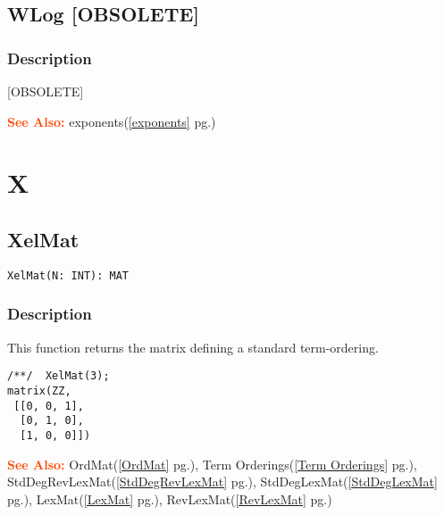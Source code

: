 \documentclass[a4paper]{mybook}
\newenvironment{command}{}{} %
\newcommand\SeeAlso{\par\textcolor{OrangeRed}{\textbf{\large See Also: }}}
\begin{document}
\section{WLog [OBSOLETE]}
\label{WLog [OBSOLETE]}
\begin{command} %



\subsection*{Description}

[OBSOLETE]

\SeeAlso %
  exponents(\ref{exponents} pg.\pageref{exponents})
\end{command} %

\chapter{X}  %
\label{X}

\section{XelMat}
\label{XelMat}
\begin{command} %


\begin{Verbatim}[label=syntax, rulecolor=\color{MidnightBlue},
frame=single]
XelMat(N: INT): MAT
\end{Verbatim}


\subsection*{Description}

This function returns the matrix defining a standard term-ordering.
\begin{Verbatim}[label=example, rulecolor=\color{PineGreen}, frame=single]
/**/  XelMat(3);
matrix(ZZ,
 [[0, 0, 1],
  [0, 1, 0],
  [1, 0, 0]])
\end{Verbatim}


\SeeAlso %
  OrdMat(\ref{OrdMat} pg.\pageref{OrdMat}), 
    Term Orderings(\ref{Term Orderings} pg.\pageref{Term Orderings}), 
    StdDegRevLexMat(\ref{StdDegRevLexMat} pg.\pageref{StdDegRevLexMat}), 
    StdDegLexMat(\ref{StdDegLexMat} pg.\pageref{StdDegLexMat}), 
    LexMat(\ref{LexMat} pg.\pageref{LexMat}), 
    RevLexMat(\ref{RevLexMat} pg.\pageref{RevLexMat})
\end{command} %
\end{document}
